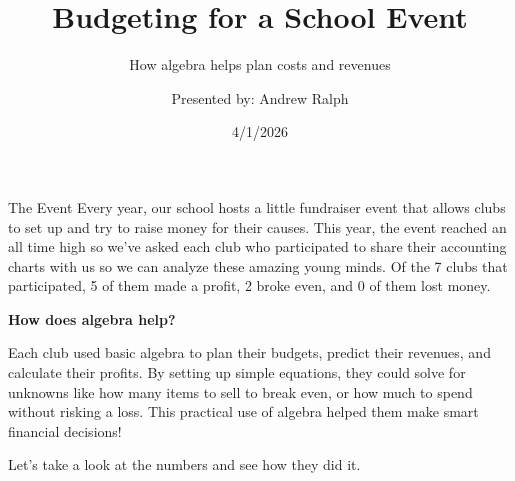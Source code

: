 \documentclass[12pt]{beamer}
\title{Budgeting for a School Event}
\subtitle{How algebra helps plan costs and revenues}
\author{Presented by: Andrew Ralph}
\date{4/1/2026}
\begin{document}
\begin{frame}
\titlepage
\end{frame}
\begin{frame}{The Event}
    Every year, our school hosts a little fundraiser event that allows clubs
    to set up and try to raise money for their causes.
    This year, the event reached an all time high so we've asked each club who
    participated to share their accounting charts with us so we can
    analyze these amazing young minds. Of the 7 clubs that participated,
    5 of them made a profit, 2 broke even, and 0 of them lost money.

    \vspace{1em}
    \textbf{How does algebra help?}

    Each club used basic algebra to plan their budgets, predict their revenues, and calculate their profits. By setting up simple equations, they could solve for unknowns like how many items to sell to break even, or how much to spend without risking a loss. This practical use of algebra helped them make smart financial decisions!

    Let's take a look at the numbers and see how they did it.

\end{frame}
\end{document}

